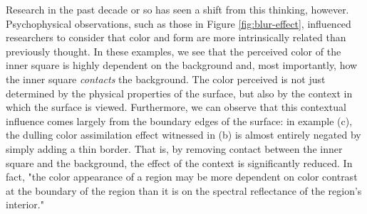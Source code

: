 \documentclass[journal,onecolumn]{IEEEtran}
\begin{document}
Research in the past decade or so has seen a shift from this thinking, however. Psychophysical observations, such as those in Figure \ref{fig:blur-effect}, influenced researchers to consider that color and form are more intrinsically related than previously thought. In these examples, we see that the perceived color of the inner square is highly dependent on the background and, most importantly, how the inner square \textit{contacts} the background. The color perceived is not just determined by the physical properties of the surface, but also by the context in which the surface is viewed. Furthermore, we can observe that this contextual influence comes largely from the boundary edges of the surface: in example (c), the dulling color assimilation effect witnessed in (b) is almost entirely negated by simply adding a thin border. That is, by removing contact between the inner square and the background, the effect of the context is significantly reduced. In fact, "the color appearance of a region may be more dependent on color contrast at the boundary of the region than it is on the spectral reflectance of the region's interior." \cite[p.572]{chualupa:encyclopedia}
\end{document}
